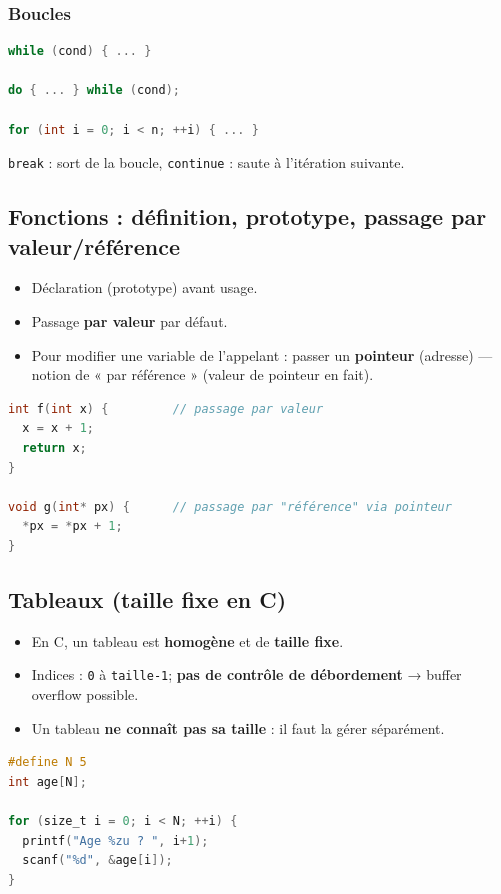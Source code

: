 \subsubsection{Boucles}
\begin{lstlisting}[language=C]
while (cond) { ... }

do { ... } while (cond);

for (int i = 0; i < n; ++i) { ... }
\end{lstlisting}

\texttt{break} : sort de la boucle, \texttt{continue} : saute à l’itération suivante.

\subsection{Fonctions : définition, prototype, passage par valeur/référence}
\begin{itemize}
  \item Déclaration (prototype) avant usage.
  \item Passage \textbf{par valeur} par défaut.
  \item Pour modifier une variable de l’appelant : passer un \textbf{pointeur} (adresse) — notion de « par référence » (valeur de pointeur en fait).
\end{itemize}

\begin{lstlisting}[language=C]
int f(int x) {         // passage par valeur
  x = x + 1;
  return x;
}

void g(int* px) {      // passage par "référence" via pointeur
  *px = *px + 1;
}
\end{lstlisting}

\subsection{Tableaux (taille fixe en C)}
\begin{itemize}
  \item En C, un tableau est \textbf{homogène} et de \textbf{taille fixe}. 
  \item Indices : \texttt{0} à \texttt{taille-1}; \textbf{pas de contrôle de débordement} → buffer overflow possible.
  \item Un tableau \textbf{ne connaît pas sa taille} : il faut la gérer séparément. 
\end{itemize}

\begin{lstlisting}[language=C]
#define N 5
int age[N];

for (size_t i = 0; i < N; ++i) {
  printf("Age %zu ? ", i+1);
  scanf("%d", &age[i]);
}
\end{lstlisting}

